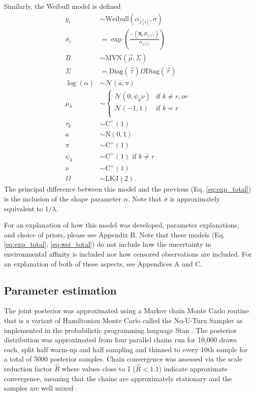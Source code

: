 \documentclass{article}
\begin{document}
Similarly, the Weibull model is defined
\begin{equation}
  \begin{aligned}
    y_{i} &\sim \mathrm{Weibull}(\alpha_{j[i]}, \sigma) \\
    \sigma_{i} &= \exp\left(\frac{-(\mathbf{X}_{i} B_{j[i]})}{\alpha_{j[i]}}\right) \\
    B &\sim \mathrm{MVN}(\vec{\mu}, \Sigma) \\
    \Sigma &= \text{Diag}(\vec{\tau}) \Omega \text{Diag}(\vec{\tau}) \\
    \log(\alpha) &\sim \mathcal{N}(a, \pi) \\
    \mu_{k} &\sim 
    \begin{cases} 
      \mathcal{N}(0, \psi_{k} \nu) & \text{if } k \neq r, or \\
      \mathcal{N}(-1, 1) & \text{if } k = r \\ 
    \end{cases} \\
    \tau_{k} &\sim \mathrm{C^{+}}(1) \\
    a &\sim \mathrm{N}(0, 1) \\
    \pi &\sim \mathrm{C^{+}}(1) \\
    \psi_{k} &\sim \mathrm{C^{+}}(1) \text{ if } k \neq r \\
    \nu &\sim \mathrm{C^{+}}(1) \\
    \Omega &\sim \text{LKJ}(2).
  \end{aligned}
  \label{eq:wei_total}
\end{equation}
The principal difference between this model and the previous (Eq. \ref{eq:exp_total}) is the inclusion of the shape parameter \(\alpha\). Note that \(\sigma\) is approximately equivalent to \(1 / \lambda\).

For an explanation of how this model was developed, parameter explanations, and choice of priors, please see Appendix B. Note that these models (Eq. \ref{eq:exp_total}, \ref{eq:wei_total}) do not include how the uncertainty in environmental affinity is included nor how censored observations are included. For an explanation of both of these aspects, see Appendices A and C.

\subsection{Parameter estimation}

The  joint posterior was approximated using a Markov chain Monte Carlo routine that is a variant of Hamiltonian Monte Carlo called the No-U-Turn Sampler \citep{Hoffman2014} as implemented in the probabilistic programming language Stan \citep{2014stan}. The posterior distribution was approximated from four parallel chains run for 10,000 draws each, split half warm-up and half sampling and thinned to every 10th sample for a total of 5000 posterior samples. Chain convergence was assessed via the scale reduction factor \(\hat{R}\) where values close to 1 (\(\hat{R} < 1.1\)) indicate approximate convergence, meaning that the chains are approximately stationary and the samples are well mixed \citep{Gelman2013d}.
\end{document}

